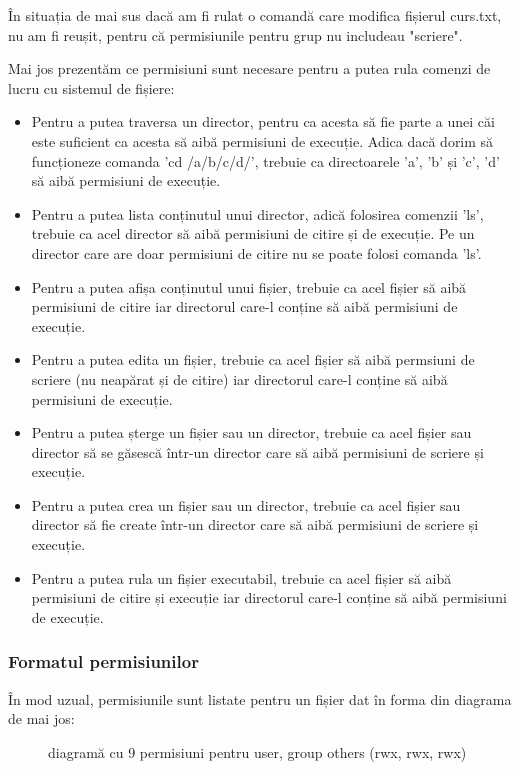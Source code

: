 În situația de mai sus dacă am fi rulat o comandă care modifica fișierul
curs.txt, nu am fi reușit, pentru că permisiunile pentru grup nu includeau
"scriere".

Mai jos prezentăm ce permisiuni sunt necesare pentru a putea rula comenzi de
lucru cu sistemul de fișiere:

\begin{itemize}
	\item Pentru a putea traversa un director, pentru ca acesta să fie parte
		a unei căi este suficient ca acesta să aibă permisiuni de
		execuție. Adica dacă dorim să funcționeze comanda 'cd
		/a/b/c/d/', trebuie ca directoarele 'a', 'b' și 'c', 'd' să aibă
		permisiuni de execuție.
	\item Pentru a putea lista conținutul unui director, adică folosirea
		comenzii 'ls', trebuie ca acel director să aibă permisiuni de
		citire și de execuție. Pe un director care are doar permisiuni
		de citire nu se poate folosi comanda 'ls'.
	\item Pentru a putea afișa conținutul unui fișier, trebuie ca acel
		fișier să aibă permisiuni de citire iar directorul care-l
		conține să aibă permisiuni de execuție.
	\item Pentru a putea edita un fișier, trebuie ca acel fișier să aibă
		permsiuni de scriere (nu neapărat și de citire) iar directorul
		care-l conține să aibă permisiuni de execuție.
	\item Pentru a putea șterge un fișier sau un director, trebuie ca acel
		fișier sau director să se găsescă într-un director care să aibă
		permisiuni de scriere și execuție.
	\item Pentru a putea crea un fișier sau un director, trebuie ca acel
		fișier sau director să fie create într-un director care să aibă
		permisiuni de scriere și execuție.
	\item Pentru a putea rula un fișier executabil, trebuie ca acel fișier
		să aibă permisiuni de citire și execuție iar directorul care-l
		conține să aibă permisiuni de execuție.
\end{itemize}

\subsubsection{Formatul permisiunilor}
\label{sec:users-fs-perms-format}

În mod uzual, permisiunile sunt listate pentru un fișier dat în forma din
diagrama de mai jos:

\begin{figure}[htbp]
	\centering
	\def\svgwidth{\columnwidth}
	
	\caption{diagramă cu 9 permisiuni pentru user, group others (rwx, rwx, rwx)}
	\label{fig:user-octal-perm}
\end{figure}

